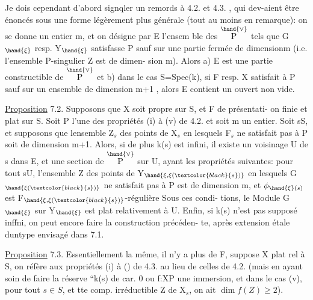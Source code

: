 
Je dois cependant d'abord signqler un remords à 4.2. et 4.3. , qui
dev-aient être énoncés sous une forme légèrement plus générale (tout au
moins en remarque): on se donne un entier m, et on désigne par E l'ensem
ble des \hand{$\xi\in$}$\overset{\hand{\vee}}{\text{P}}$ tels que G$_{\hand{\xi}}$ resp. Y$_{\hand{\xi}}$ satisfasse P sauf  sur une
partie fermée de dimension\hand{$\leq$}m (i.e. l'ensemble P-singulier Z est de dimen-%
sion\hand{$\leq$} m). Alors a) E est une partie constructible de $\overset{\hand{\vee}}{\text{P}}$ et b) dans le
cas S=Spec(k), si F resp. X satisfait à P sauf  sur un ensemble de
dimension\hand{$\leq$} m+1 , alors E contient un ouvert non vide.

\uline{Proposition} 7.2. Supposons que X soit propre sur S, et F de présentati-%
on finie et plat sur S. Soit P l'une des propriétés (i) à (v) de 4.2.
et soit m un entier. Soit s\hand{$\in$}S, et supposons que 
 lensemble Z$_s$ des points de X$_s$ en lesquels F$_s$ ne satisfait
pas à P soit de dimension \hand{$\leq$} m+1. Alors, si de plus k(s) est infini, il
existe un voisinage U de s dans E, et une section \hand{$\xi$} de $\overset{\hand{\vee}}{\text{P}}$ sur U, ayant
les propriétés suivantes: pour tout s\hand{$\in$}U, l'ensemble Z des points
de  Y$_{\hand{\xi,\xi(\textcolor{black}{s})}}$ en lesquels G$_{\hand{\xi(\textcolor{black}{s})}}$ ne satisfait pas à P est de dimension
\hand{$\leq$}m, et $\phi_{\hand{\xi}(s)}$ est F$_{\hand{\xi,\xi(\textcolor{black}{s})}}$-régulière\hand{,}  Sous ces condi-%
tions, le Module G$_{\hand{\xi}}$ sur Y$_{\hand{\xi}}$ est plat relativement à U. Enfin, si k(s)
n'est pas supposé inffni, on peut encore faire la construction précéden-%
te, après extension étale duntype envisagé dans 7.1.

\uline{Proposition} 7.3. Essentiellement la même, il n'y a plus de F, 
suppose X plat rel à S, on réfère aux propriétés (i) à () de 4.3. au
lieu de celles de 4.2. (mais en ayant soin de faire  la réserve
``k(s) de car. 0 ou f:X\hand{$\longrightarrow$}P une immersion\hand{\unsure{$\xi$}}, et dans le cas (v), pour tout $s\in S$, et tte comp. irréductible Z de X$_s$, on ait $\dim f(Z)\geq 2$).





